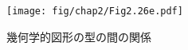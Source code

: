 \begin{figure}[tb]
\label{Figure 2.26}
\centering
\begin{comment}
\heading{Figure 2.26:} Relations among types of geometric figures.

\begin{example}
                     polygon
                    /       \
                   /         \
            triangle         quadrilateral
            /     \              /     \
           /       \            /       \
     isosceles   right      trapezoid   kite
     triangle    triangle       |         |
      |     \      |            |         |
      |      \     |            |         |
equilateral   isosceles   parallelogram   |
triangle      right          |       \    |
              triangle       |        \   |
                          rectangle  rhombus
                                \    /
                                 \  /
                                square
\end{example}
\end{comment}
\texttt{[image: fig/chap2/Fig2.26e.pdf]}
\par\bigskip
\noindent
{} 幾何学的図形の型の間の関係
\end{figure}

